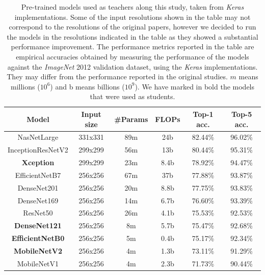\documentclass{elsarticle}
\begin{document}
	\begin{table}[h]
		\small
		\caption{Pre-trained models used as teachers along this study, taken from \textit{Keras} implementations. Some of the input resolutions shown in the table may not correspond to the resolutions of the original papers, however we decided to run the models in the resolutions indicated in the table as they showed a substantial performance improvement. The performance metrics reported in the table are empirical accuracies obtained by measuring the performance of the models against the \textit{ImageNet} 2012 validation dataset, using the \textit{Keras} implementations. They may differ from the performance reported in the original studies. $m$ means millions ($10^6$) and b means billions ($10^9$). We have marked in bold the models that were used as students.}
		\centering
	\begin{tabular}{c|ccc|cc}
		\toprule
		         Model          & Input size & \#Params &  FLOPs  & Top-1 acc. & Top-5 acc. \\ \midrule
		      NasNetLarge       &  331x331   &   89m    &  24b & 82.44\%  &  96.02\%    \\
		   InceptionResNetV2    &  299x299   &   56m    & 13b & 80.44\%  &  95.31\%     \\
		   \textbf{Xception}    &  299x299   &   23m    &  8.4b & 78.92\%  &  94.47\%     \\
		    EfficientNetB7      &  256x256   &   67m    &  37b & 77.88\%  &  93.87\%     \\
		      DenseNet201       &  256x256   &   20m    &  8.8b & 77.75\%  &  93.83\%     \\
		      DenseNet169       &  256x256   &   14m    & 6.7b & 76.60\%  &  93.39\%     \\
		       ResNet50         &  256x256   &   26m    & 4.1b  & 75.53\%  &  92.53\%     \\
		 \textbf{DenseNet121}   &  256x256   &    8m    &  5.7b & 75.47\%  &  92.68\%     \\
		\textbf{EfficientNetB0} &  256x256   &    5m    & 0.4b & 75.17\%  &  92.34\%     \\
		 \textbf{MobileNetV2}   &  256x256   &    4m    &  1.3b & 73.11\%  &  91.29\%     \\
		      MobileNetV1       &  256x256   &    4m    & 2.3b & 71.73\%  &  90.44\%     \\ \bottomrule
	\end{tabular}
	\label{table:models}
	\end{table}
\end{document}
